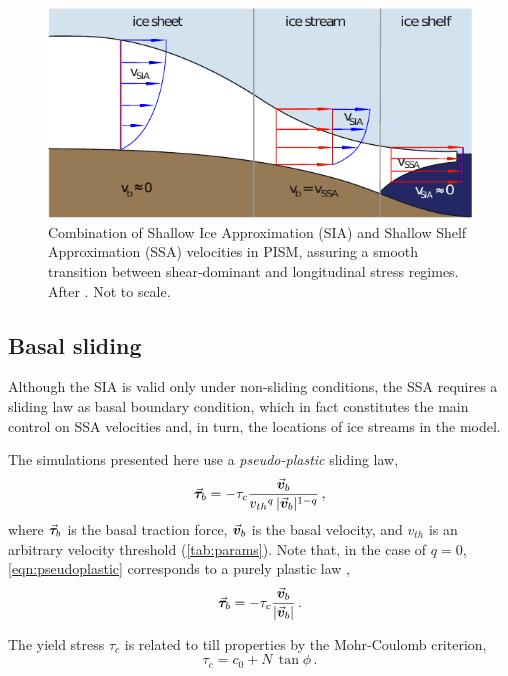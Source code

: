 \documentclass[a4paper]{kappa}
\newcommand{\vect}[1]{\va*{#1}} %
\newcommand{\vv}[0]{\vect{v}}           %
\begin{document}
\begin{figure}
  \includegraphics{model-siassa}
  \caption{Combination of Shallow Ice Approximation (SIA) and Shallow Shelf
           Approximation (SSA) velocities in PISM, assuring a smooth transition
           between shear-dominant and longitudinal stress regimes. After
           \citet[Fig.~1]{Winkelmann.etal.2011}. Not to scale.}
  \label{fig:model-siassa}
\end{figure}


\subsection{Basal sliding}

Although the SIA is valid only under non-sliding conditions, the SSA requires
a sliding law as basal boundary condition, which in fact constitutes the main
control on SSA velocities and, in turn, the locations of ice streams in the
model.

The simulations presented here use a \emph{pseudo-plastic} sliding law,
\begin{equation}
    \label{eqn:pseudoplastic}
    \vect{\tau}_b = -\tau_c \frac{\vv_b}{{v_{th}}^q\,|\vv_b|^{1-q}} \,,
\end{equation}
where $\vect{\tau}_b$ is the basal traction force, $\vv_b$ is the basal
velocity, and $v_{th}$ is an arbitrary velocity threshold
(\cref{tab:params}). Note that, in the case of
$q=0$, \cref{eqn:pseudoplastic} corresponds to a purely plastic law
\citep[Eq.~11]{Winkelmann.etal.2011},
\begin{equation}
    \label{eqn:plastic}
    \vect{\tau}_b = -\tau_c \frac{\vv_b}{|\vv_b|} \,.
\end{equation}

The yield stress $\tau_c$ is related to till properties by the Mohr-Coulomb
criterion,
\begin{equation}
    \label{eqn:coulomb}
    \tau_c = c_0 + N\,\tan{\phi} \,.
\end{equation}
\end{document}
